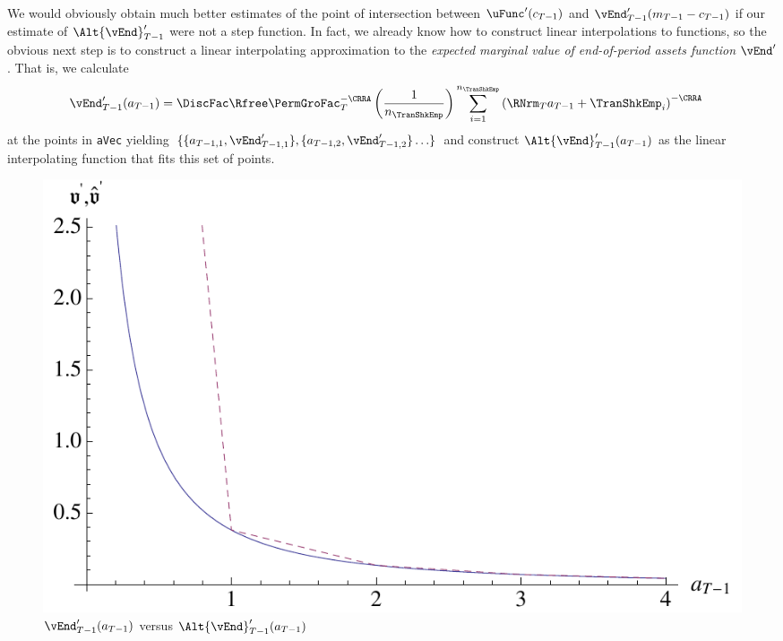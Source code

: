\documentclass[titlepage, headings=optiontotocandhead]{\econtex}
\begin{document}
We would obviously obtain much better estimates of the point of
intersection between $\uFunc^{\prime}({c}_{T-1})$ and
$\vEnd_{T-1}^{\prime}({m}_{T-1}-{c}_{T-1})$ if our estimate of
$\Alt{\vEnd}^{\prime}_{T-1}$ were not a step function.  In
fact, we already know how to construct linear interpolations
to functions, so the obvious next step is to construct a
linear interpolating approximation to the \textit{expected marginal
  value of end-of-period assets function} $\vEnd^{\prime}$. That is, we calculate
\begin{equation}\begin{gathered}\begin{aligned}
      \vEnd_{T-1}^{\prime}({a}_{T-1})  & =  \DiscFac \Rfree \PermGroFac_{T}^{-\CRRA} \left(\frac{1}{n_{\TranShkEmp}}\right) \sum_{i=1}^{n_{\TranShkEmp}} \left(\RNrm_{T} {a}_{T-1} + \TranShkEmp_{i}\right)^{-\CRRA} \label{eq:vEndPrimeTm1}
    \end{aligned}\end{gathered}\end{equation}
at the points in \texttt{aVec} yielding
$\{\{\null{a}_{T-1,1},\vEnd_{T-1,1}^{\prime}\},\{{a}_{T-1,2},\vEnd_{T-1,2}^{\prime}\}
\ldots\}$ and construct
$\Alt{\vEnd}_{T-1}^{\prime}({a}_{T-1})$ as the linear
interpolating function that fits this set of points.

\hypertarget{PlotOPRawVSFOC}{}
\begin{figure}
  \includegraphics{./Figures/PlotOPRawVSFOC}
  \caption{$\vEnd_{T-1}^{\prime}({a}_{T-1})$ versus $\Alt{\vEnd}_{T-1}^{\prime}({a}_{T-1})$}
  \label{fig:PlotOPRawVSFOC}
\end{figure}
\end{document}
